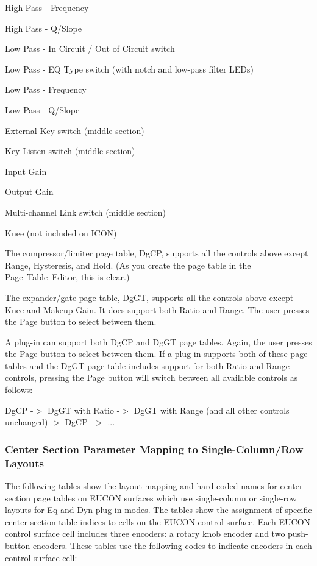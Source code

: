 \begin{DoxyItemize}
\begin{DoxyEnumerate}
\item High Pass -\/ Frequency  
\item High Pass -\/ Q/\+Slope  
\item Low Pass -\/ In Circuit / Out of Circuit switch  
\item Low Pass -\/ EQ Type switch (with notch and low-\/pass filter L\+E\+Ds) 
\item Low Pass -\/ Frequency  
\item Low Pass -\/ Q/\+Slope  
\item External Key switch (middle section)  
\item Key Listen switch (middle section)  
\item Input Gain  
\item Output Gain  
\item Multi-\/channel Link switch (middle section)  
\item Knee (not included on I\+C\+ON)  
\end{DoxyEnumerate}
\end{DoxyItemize}

The compressor/limiter page table, Dg\+CP, supports all the controls above except Range, Hysteresis, and Hold. (As you create the page table in the \mbox{\hyperlink{a00833_subsection_creating_page_tables_in_pete}{Page Table Editor}}, this is clear.)

The expander/gate page table, Dg\+GT, supports all the controls above except Knee and Makeup Gain. It does support both Ratio and Range. The user presses the Page button to select between them.

A plug-\/in can support both Dg\+CP and Dg\+GT page tables. Again, the user presses the Page button to select between them. If a plug-\/in supports both of these page tables and the Dg\+GT page table includes support for both Ratio and Range controls, pressing the Page button will switch between all available controls as follows\+:

Dg\+CP -\/$>$ Dg\+GT with Ratio -\/$>$ Dg\+GT with Range (and all other controls unchanged)-\/$>$ Dg\+CP -\/$>$ ...

\hypertarget{a00833_aax_page_table_guide_04_avid_center_section_page_tables_eucon_mapping}{}\subsubsection{Center Section Parameter Mapping to Single-\/\+Column/\+Row Layouts}\label{a00833_aax_page_table_guide_04_avid_center_section_page_tables_eucon_mapping}
 The following tables show the layout mapping and hard-\/coded names for center section page tables on E\+U\+C\+ON surfaces which use single-\/column or single-\/row layouts for Eq and Dyn plug-\/in modes. The tables show the assignment of specific center section table indices to cells on the E\+U\+C\+ON control surface. Each E\+U\+C\+ON control surface cell includes three encoders\+: a rotary knob encoder and two push-\/button encoders. These tables use the following codes to indicate encoders in each control surface cell\+:


